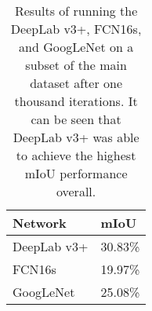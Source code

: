 \begin{table}[b]
	\centering
	\begin{tabular}{@{}ll@{}}
		\toprule
		Network     & mIoU \\ \midrule
		DeepLab v3+ & 30.83\%   \\
		FCN16s      & 19.97\%   \\
		GoogLeNet   & 25.08\%   \\ \bottomrule
	\end{tabular}
	\caption[Network Comparison Results]{Results of running the DeepLab v3+, FCN16s, and GoogLeNet on a subset of the main dataset after one thousand iterations. It can be seen that DeepLab v3+ was able to achieve the highest mIoU performance overall.}
	\label{tab:network-comparison}
\end{table}
